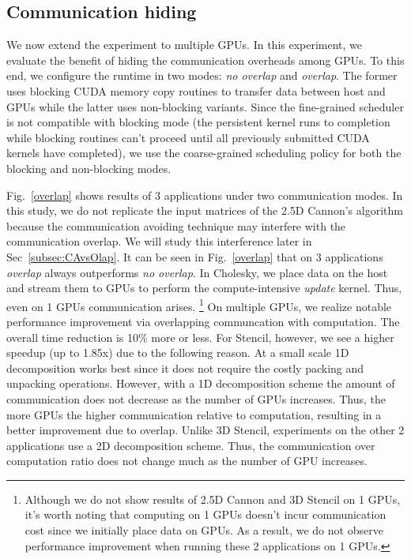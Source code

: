 \subsection{Communication hiding}
We now extend the experiment to multiple GPUs.
In this experiment, we evaluate the benefit of hiding the communication overheads among GPUs.
To this end, we configure the runtime in two modes: {\em no overlap} and {\em overlap}.
The former uses blocking CUDA memory copy routines to transfer data between host and GPUs while the latter uses non-blocking variants.
Since the fine-grained scheduler is not compatible with blocking mode (the persistent kernel runs to completion while blocking routines can't proceed until all previously submitted CUDA kernels have completed), we use the coarse-grained scheduling policy for both the blocking and non-blocking modes.

Fig.~\ref{overlap} shows results of 3 applications under two communication modes.
In this study, we do not replicate the input matrices of the 2.5D Cannon's algorithm because the communication avoiding technique may interfere with the communication overlap.
We will study this interference later in Sec~\ref{subsec:CAvsOlap}.
It can be seen in Fig.~\ref{overlap} that on 3 applications {\em overlap} always outperforms {\em no overlap}.
In Cholesky, we place data on the host and stream them to GPUs to perform the compute-intensive {\em update} kernel.
Thus, even on 1 GPUs communication arises.
\footnote{Although we do not show results of 2.5D Cannon and 3D Stencil on 1 GPUs, it's worth noting that computing on 1 GPUs doesn't incur communication cost since we initially place data on GPUs.
As a result, we do not observe performance improvement when running these 2 applications on 1 GPUs.}
On multiple GPUs, we realize notable performance improvement via overlapping communcation with computation.
The overall time reduction is 10\% more or less.
For Stencil, however, we see a higher speedup (up to 1.85x) due to the following reason.
At a small scale 1D decomposition works best since it does not require the costly packing and unpacking operations.
However, with a 1D decomposition scheme the amount of communication does not decrease as the number of GPUs increases.
Thus, the more GPUs the higher communication relative to computation, resulting in a better improvement due to overlap.
Unlike 3D Stencil, experiments on the other 2 applications use a 2D decomposition scheme.
Thus, the communication over computation ratio does not change much as the number of GPU increases.

